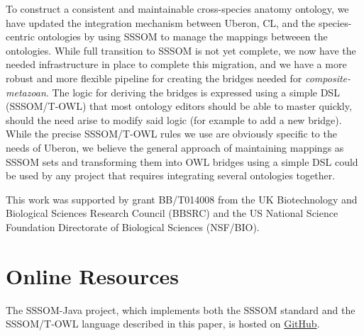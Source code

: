 \documentclass{ceurart}
\begin{document}
To construct a consistent and maintainable cross-species anatomy
ontology, we have updated the integration mechanism between Uberon, CL,
and the species-centric ontologies by using SSSOM to manage the mappings
betweeen the ontologies. While full transition to SSSOM is not yet
complete, we now have the needed infrastructure in place to complete
this migration, and we have a more robust and more flexible pipeline for
creating the bridges needed for \emph{composite-metazoan}. The logic for
deriving the bridges is expressed using a simple DSL (SSSOM/T-OWL) that
most ontology editors should be able to master quickly, should the need
arise to modify said logic (for example to add a new bridge). While the
precise SSSOM/T-OWL rules we use are obviously specific to the needs of
Uberon, we believe the general approach of maintaining mappings as SSSOM
sets and transforming them into OWL bridges using a simple DSL could be
used by any project that requires integrating several ontologies
together.

\begin{acknowledgments}
This work was supported by grant BB/T014008 from the UK Biotechnology
and Biological Sciences Research Council (BBSRC) and the US National
Science Foundation Directorate of Biological Sciences (NSF/BIO).
\end{acknowledgments}



\appendix

\section{Online Resources}

The SSSOM-Java project, which implements both the SSSOM standard and the
SSSOM/T-OWL language described in this paper, is hosted on
\href{https://github.com/gouttegd/sssom-java/}{GitHub}.
\end{document}
